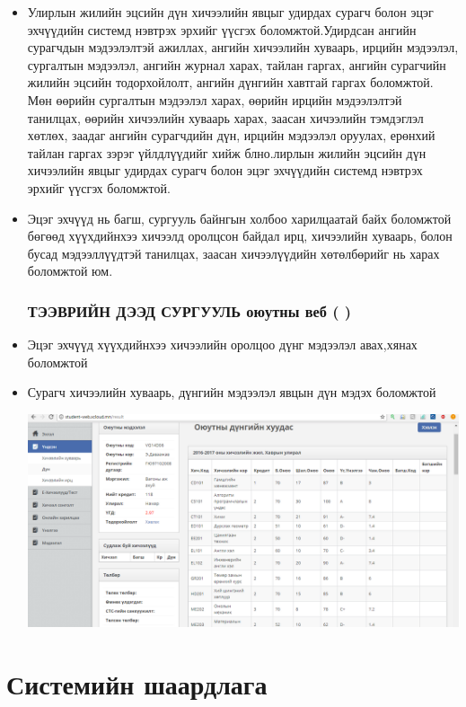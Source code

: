 \documentclass[12pd]{article}
\begin{document}
\begin{itemize}
	\item  Улирлын жилийн эцсийн дүн хичээлийн явцыг удирдах сурагч болон эцэг эхчүүдийн системд нэвтрэх эрхийг үүсгэх боломжтой.Удирдсан ангийн сурагчдын мэдээлэлтэй ажиллах, ангийн хичээлийн хуваарь, ирцийн мэдээлэл, сургалтын мэдээлэл, ангийн журнал харах, тайлан гаргах, ангийн сурагчийн жилийн эцсийн тодорхойлолт, ангийн дүнгийн хавтгай гаргах боломжтой. Мөн өөрийн сургалтын мэдээлэл харах, өөрийн ирцийн мэдээлэлтэй танилцах, өөрийн хичээлийн хуваарь харах, заасан хичээлийн тэмдэглэл хөтлөх, заадаг ангийн сурагчдийн дүн, ирцийн мэдээлэл оруулах, ерөнхий тайлан гаргах зэрэг үйлдлүүдийг хийж блно.лирлын жилийн эцсийн дүн хичээлийн явцыг удирдах сурагч болон эцэг эхчүүдийн системд нэвтрэх эрхийг үүсгэх боломжтой.
	\item Эцэг эхчүүд нь  багш, сургууль байнгын холбоо харилцаатай байх боломжтой  бөгөөд хүүхдийнхээ хичээлд оролцсон байдал ирц, хичээлийн хуваарь, болон бусад мэдээллүүдтэй танилцах, заасан хичээлүүдийн хөтөлбөрийг нь харах боломжтой юм.
	
	\subsubsection{ТЭЭВРИЙН ДЭЭД СУРГУУЛЬ оюутны веб (
		)}
	\item Эцэг эхчүүд  хүүхдийнхээ  хичээлийн оролцоо дүнг мэдээлэл авах,хянах боломжтой
	\item Сурагч хичээлийн хуваарь, дүнгийн мэдээлэл  явцын дүн мэдэх боломжтой

	\includegraphics[width=\textwidth]{zurag}
\end{itemize}

	\section {Системийн шаардлага}
\end{document}
